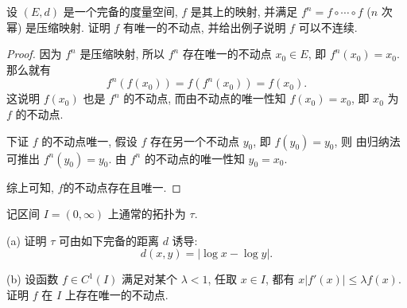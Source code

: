 \begin{exercise}
    设 $(E,d)$ 是一个完备的度量空间, $f$ 是其上的映射, 并满足 $f^n=f\circ\cdots\circ f$
    ($n$ 次幂) 是压缩映射. 证明 $f$ 有唯一的不动点, 并给出例子说明 $f$ 可以不连续.
\end{exercise}

\begin{proof}
    因为 $f^n$ 是压缩映射, 所以 $f^n$ 存在唯一的不动点 $x_0\in E$, 即
    $f^n(x_0)=x_0$. 那么就有
    \[f^n(f(x_0))=f(f^n(x_0))=f(x_0).\]
    这说明 $f(x_0)$ 也是 $f^n$ 的不动点, 而由不动点的唯一性知 $f(x_0)=x_0$, 即 $x_0$ 为 $f$ 的不动点.

    下证 $f$ 的不动点唯一, 假设 $f$ 存在另一个不动点 $y_0$, 即 $f(y_0)=y_0$, 则
    由归纳法可推出 $f^n(y_0)=y_0$. 由 $f^n$ 的不动点的唯一性知 $y_0=x_0$.
    
    综上可知, $f$的不动点存在且唯一.
\end{proof}

\begin{exercise}
    记区间 $I=(0,\infty)$ 上通常的拓扑为 $\tau$.

    (a) 证明 $\tau$ 可由如下完备的距离 $d$ 诱导:
    \[d(x,y)=|\log x-\log y|.\]

    (b) 设函数 $f\in C^1(I)$ 满足对某个 $\lambda<1$, 任取 $x\in I$, 都有
    $x|f'(x)|\leq\lambda f(x)$. 证明 $f$ 在 $I$ 上存在唯一的不动点.
\end{exercise}

